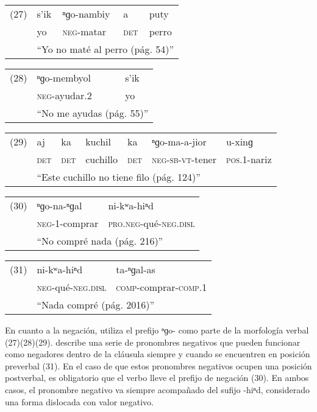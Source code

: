 {\setmainfont{Doulos SIL}
\begin{tabular}{lllll}
 (27) & s'ik & ⁿɡo-nambiy & a & puty\\
& yo & \textsc{neg}-matar & \textsc{det} & perro \\
& \multicolumn{4}{l}{``Yo no maté al perro (pág. 54)''}
\end{tabular}\vspace{0.15cm}

\begin{tabular}{lll}
(28) & ⁿɡo-membyol & s'ik \\
& \textsc{neg}-ayudar.2 & yo \\
& \multicolumn{2}{l}{``No me ayudas (pág. 55)''} \\
\end{tabular} \vspace{0.15cm}

\begin{tabular}{lllllll}
(29) & aj & ka & kuchil & ka & ⁿɡo-ma-a-jior & u-xinɡ \\
& \textsc{det} & \textsc{det} & cuchillo & \textsc{det} & \textsc{neg-sb-vt}-tener & \textsc{pos.1}-nariz \\
& \multicolumn{6}{l}{``Este cuchillo no tiene filo (pág. 124)''} \\
\end{tabular} \vspace{0.15cm}

\begin{tabular}{lll}
(30) & ⁿɡo-na-ⁿɡal & ni-kʷa-hiⁿd \\
& \textsc{neg}-1-comprar & \textsc{pro.neg}-qué-\textsc{neg.disl} \\
& \multicolumn{2}{l}{``No compré nada (pág. 216)''} \\
\end{tabular} \vspace{0.15cm}

\begin{tabular}{lll}
(31) & ni-kʷa-hiⁿd & ta-ⁿɡal-as \\
& \textsc{neg}-qué-\textsc{neg.disl} & \textsc{comp}-comprar-\textsc{comp.1} \\
& \multicolumn{2}{l}{``Nada compré (pág. 2016)''} \\
\end{tabular} \vspace{0.2cm}
}

En cuanto a la negación, utiliza el prefijo {\setmainfont{Doulos SIL} ⁿɡo-} como parte de la morfología verbal (27)(28)(29). \textcolor{MidnightBlue}{\citet{Huave}} describe una serie de pronombres negativos que pueden funcionar como negadores dentro de la cláusula siempre y cuando se encuentren en posición preverbal (31). En el caso de que estos pronombres negativos ocupen una posición postverbal, es obligatorio que el verbo lleve el prefijo de negación (30). En ambos casos, el pronombre negativo va siempre acompañado del sufijo {\setmainfont{Doulos SIL} -hiⁿd}, considerado una forma dislocada con valor negativo.
